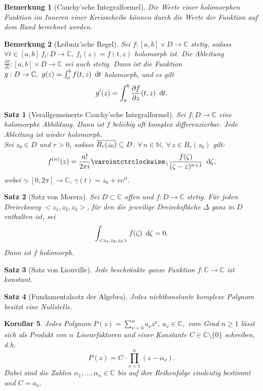 \documentclass[a4paper,12pt]{book}
\theoremstyle{newthm}
\newtheorem{thm}{Satz}[section]
\newtheorem{cor}[thm]{Korollar}
\theoremstyle{newdef}
\theoremstyle{newrem}
\newtheorem*{rem}{Bemerkung}
\newcommand{\N}{\mathbb{N}}
\newcommand{\C}{\mathbb{C}}
\renewcommand{\d}{\ \operatorname{d}\hspace{-2px}}
\newcommand{\del}{\partial}
\newcommand{\overbar}[1]{\mkern 1.5mu\overline{\mkern-1.5mu#1\mkern-1.5mu}\mkern 1.5mu}
\begin{document}
		\begin{rem}[Cauchy'sche Integralformel]
			Die Werte einer holomorphen Funktion im Inneren einer Kreisscheibe können durch die Werte der Funktion auf dem Rand berechnet werden.
		\end{rem}
		
		\begin{rem}[Leibniz'sche Regel]
			Sei $ f: [a,b]\times D \to \C $ stetig, sodass $ \forall t \in [a,b]\ f_t: D \to \C,\ f_t(z) = f(t,z) $ holomorph ist. Die Ableitung $ \frac{\del f}{\del z}: [a,b]\times D \to \C $ sei auch stetig. Dann ist die Funktion $ g: D \to \C,\ g(z) = \int_a^b f(t,z) \d t $ holomorph, und es gilt
			\[ g'(z) = \int_a^b \frac{\del f}{\del z}(t,z)\d t. \]
		\end{rem}
		\begin{thm}[Verallgemeinerte Cauchy'sche Integralformel]\label{2.3.6}
			Sei $ f: D \to \C $ eine holomorphe Abbildung. Dann ist $f$ beliebig oft komplex differenzierbar. Jede Ableitung ist wieder holomorph.\\
			Sei $ z_0 \in D $ und $r>0$, sodass $ \overbar{B_r(z_0)} \subseteq D $. $ \forall\,n \in \N,\ \forall\, z \in B_r(z_0) $ gilt:
			\[ f^{(n)}(z) = \frac{n!}{2 \pi i} \varointctrclockwise_\gamma \frac{f(\zeta)}{(\zeta-z)^{n+1}} \d \zeta, \]
			wobei $ \gamma: [0,2\pi] \to \C,\ \gamma(t) = z_0 + re^{it}. $
		\end{thm}
		
		\begin{thm}[Satz von Morera]
			Sei $ D \subset \C $ offen und $f: D \to \C$ stetig. Für jeden Dreiecksweg $ <z_1,z_2,z_3> $, für den die jeweilige Dreiecksfläche $\Delta$ ganz in $D$ enthalten ist, sei
			\[ \int_{<z_1,z_2,z_3>} f(\zeta) \d\zeta = 0. \]
			Dann ist $f$ holomorph.
		\end{thm}
		
		\begin{thm}[Satz von Liouville]
			Jede beschränkte ganze Funktion $f: \C \to \C$ ist konstant.
		\end{thm}
		
		\begin{thm}[Fundamentalsatz der Algebra]
			Jedes nichtkonstante komplexe Polynom besitzt eine Nullstelle.
		\end{thm}
	
		\begin{cor}
			Jedes Polynom $ P(z) = \sum_{\nu=0}^{n} a_\nu z^\nu,\ a_\nu \in \C, $ vom Grad $ n \geq 1 $ lässt sich als Produkt von $n$ Linearfaktoren und einer Konstante $ C \in \C \setminus \{0\} $ schreiben, d.h. 
			$$ P(z) = C \cdot \prod_{\nu = 1}^n (z-\alpha_\nu). $$
			Dabei sind die Zahlen $ \alpha_1,\dotsc,\alpha_n \in \C $ bis auf ihre Reihenfolge eindeutig bestimmt und $ C = a_n. $
		\end{cor}
	
\end{document}

